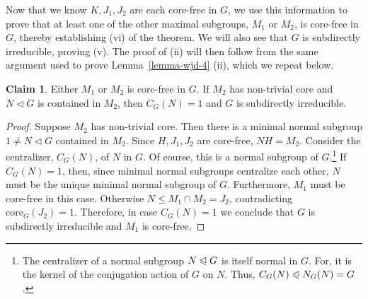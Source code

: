 \documentclass[cm,dissertation,actual,final]{uhthesis}
\theoremstyle{plain}
\theoremstyle{definition}
\newcounter{claim}
\newtheorem{claim}[claim]{Claim}
\theoremstyle{remark}
\numberwithin{theorem}{section}
\numberwithin{claim}{chapter}
\numberwithin{equation}{section}
\numberwithin{conjecture}{chapter}
\newcommand{\<}{\ensuremath{\langle}}
\renewcommand{\>}{\ensuremath{\rangle}}
\renewcommand{\leq}{\ensuremath{\leqslant}}
\newcommand{\ssubnormal}{\ensuremath{\vartriangleleft}}
\newcommand{\subnormal}{\ensuremath{\trianglelefteqslant}}
\newcommand{\core}{\ensuremath{\mathrm{core}}}
\newcommand{\0}{\ensuremath{\mathbf{0}}}
\newcommand{\1}{\ensuremath{\mathbf{1}}}
\newcommand{\2}{\ensuremath{\mathbf{2}}}
\newcommand{\3}{\ensuremath{\mathbf{3}}}
\newcommand{\4}{\ensuremath{\mathbf{4}}}
\newcommand{\5}{\ensuremath{\mathbf{5}}}
\begin{document}
Now that we know $K, J_1, J_2$ are each core-free in $G$, we use this
information to prove that at least one of the other maximal subgroups, 
$M_1$ or $M_2$, is core-free in $G$, thereby establishing (vi) of the theorem.  
We will also see that $G$ is subdirectly irreducible, proving (v).  The proof of
(ii) will then follow from the same argument used to prove 
Lemma~\ref{lemma-wjd-4} (ii), which we repeat below.

\begin{claim}
  Either $M_1$ or $M_2$ is core-free in $G$.  If $M_2$ has non-trivial core
  and $N\ssubnormal G$ is contained in $M_2$, then
  $C_G(N)=1$ and $G$ is subdirectly irreducible.
\end{claim}
\begin{proof}
  Suppose $M_2$ has non-trivial core.  Then there is 
a minimal normal subgroup $1\neq N \ssubnormal G$ 
  contained in $M_2$. %
  Since $H, J_1, J_2$ are core-free, $NH=M_2$.  Consider the centralizer,
  $C_G(N)$, of $N$ in $G$.  Of course, this is a normal subgroup 
  of $G$.\footnote{The centralizer of a normal subgroup $N\subnormal G$ is itself
    normal in $G$.  For, it is the kernel of the conjugation action of $G$ on
    $N$. Thus, $C_G(N) \subnormal N_G(N) = G$.} 
If $C_G(N) = 1$, then, since minimal normal subgroups
  centralize each other, $N$ must be the unique minimal normal subgroup of $G$.
  Furthermore, $M_1$ must be core-free in this case.  Otherwise 
  $N\leq M_1 \cap M_2 = J_2$, contradicting $\core_G(J_2)=1$. 
  Therefore, in case $C_G(N) = 1$ we 
  conclude that $G$ is subdirectly irreducible and $M_1$ is core-free.


\end{proof}
\end{document}
